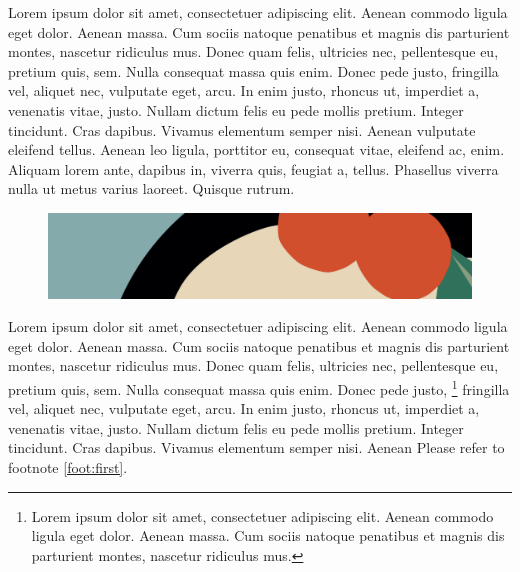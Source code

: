 \documentclass[a4paper]{article}
\begin{document}
Lorem ipsum dolor sit amet, consectetuer adipiscing elit. Aenean commodo ligula
eget dolor. Aenean massa. Cum sociis natoque penatibus et magnis dis parturient
montes, nascetur ridiculus mus. Donec quam felis, ultricies nec, pellentesque
eu, pretium quis, sem. Nulla consequat massa quis enim. Donec pede justo,
fringilla vel, aliquet nec, vulputate eget, arcu. In enim justo, rhoncus ut,
imperdiet a, venenatis vitae, justo. Nullam dictum felis eu pede mollis
pretium. Integer tincidunt. Cras dapibus. Vivamus elementum semper nisi. Aenean
vulputate eleifend tellus. Aenean leo ligula, porttitor eu, consequat vitae,
eleifend ac, enim. Aliquam lorem ante, dapibus in, viverra quis, feugiat a,
tellus. Phasellus viverra nulla ut metus varius laoreet. Quisque rutrum.

\begin{figure}[h]
	\label{fig:konigsberg}
	\includegraphics[width=\linewidth]{test-2.png}
\end{figure}

Lorem ipsum dolor sit amet, consectetuer adipiscing elit. Aenean commodo ligula
eget dolor. Aenean massa. Cum sociis natoque penatibus et magnis dis parturient
montes, nascetur ridiculus mus. Donec quam felis, ultricies nec, pellentesque
eu, pretium quis, sem. Nulla consequat massa quis enim. Donec pede justo,
\footnote{
	Lorem ipsum dolor sit amet, consectetuer adipiscing elit. Aenean commodo ligula
	eget dolor. Aenean massa. Cum sociis natoque penatibus et magnis dis parturient
	montes, nascetur ridiculus mus.
}
fringilla vel, aliquet nec, vulputate eget, arcu. In enim justo, rhoncus ut,
imperdiet a, venenatis vitae, justo. Nullam dictum felis eu pede mollis
pretium. Integer tincidunt. Cras dapibus. Vivamus elementum semper nisi. Aenean
Please refer to footnote \ref{foot:first}.
\end{document}
